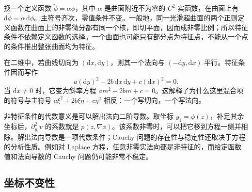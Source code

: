 换一个定义函数 \(\widetilde\phi=\alpha\phi\)，其中 \(\alpha\) 是曲面附近不为零的 \(C^2\) 实函数，在曲面上有 \(\mathrm d\widetilde\phi=\alpha\,\mathrm d\phi\)。主符号齐次，零值条件不变。一般地，同一光滑超曲面的两个正则定义函数在曲面上的非零微分都有同一个核，即切平面，因而成非零比例；所以特征条件不依赖定义函数的选择。一个曲面也可能只有部分点为特征点，不能从一个点的条件推出整张曲面均为特征。

\ProseParagraphBreak

在二维中，若曲线切向为 \((\mathrm dx,\mathrm dy)\)，则其一个法向与 \((-\mathrm dy,\mathrm dx)\) 平行。特征条件因而写作
\begin{equation}\label{b2:eq:08-characteristic-differential}
 a(\mathrm dy)^2-2b\,\mathrm dx\,\mathrm dy+c(\mathrm dx)^2=0.
\end{equation}
当 \(\mathrm dx\ne0\) 时，它变为斜率方程 \(am^2-2bm+c=0\)。这解释了为什么这里混合项的符号与主符号 \(a\xi^2+2b\xi\eta+c\eta^2\) 相反：一个写切向，一个写法向。

\ProseParagraphBreak

非特征条件的代数意义是可以解出法向二阶导数。取坐标 \(y_1=\phi(z)\)，补足其余坐标后，\(\partial_{y_1}^2v\) 的系数就是 \(p(z,\nabla\phi)\)。该系数非零时，可以把它移到方程一侧并相除。解出法向导数是一项代数条件；Cauchy 问题的存在性与稳定性还取决于方程的分析性质。例如对 Laplace 方程，任意非零实法向都是非特征的，而给定函数值和法向导数的 Cauchy 问题仍可能非常不稳定。

\subsection{坐标不变性}
\label{b2:subsec:080104}

